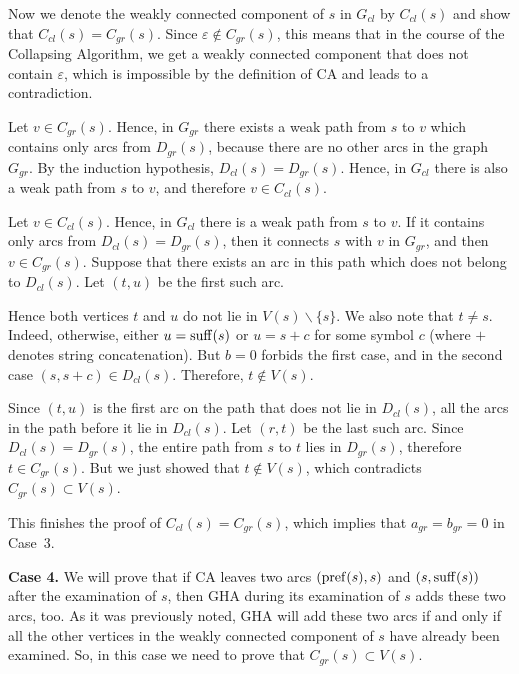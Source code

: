Now we denote the weakly connected component of $ s $ in $ G_{cl} $ by $ C_{cl} (s) $ and show that $ C_{cl} (s) = C_{gr} (s) $. Since $ \varepsilon \notin C_{gr} (s) $, this means that in the course of the Collapsing Algorithm, we get a weakly connected component that does not contain $ \varepsilon $, which is impossible by the definition of CA and leads to a contradiction.

Let $ v \in C_{gr} (s) $. Hence, in $ G_{gr} $ there exists a weak path from $ s $ to $ v $ which contains only arcs from $ D_{gr} (s) $, because there are no other arcs in the graph $G_{gr}$. By the induction hypothesis, $ D_{cl} (s) = D_{gr} (s) $. Hence, in $ G_{cl} $ there is also a weak path from $ s $ to $ v $, and therefore $ v \in C_{cl} (s) $.

Let $ v \in C_{cl} (s) $. Hence, in $ G_{cl} $ there is a weak path from $ s $ to $ v $. If it contains only arcs from $ D_{cl} (s) = D_{gr} (s) $, then it connects $ s $ with $ v $ in $ G_{gr} $, and then $ v \in C_{gr} (s) $. Suppose that there exists an arc in this path which does not belong to $ D_{cl} (s) $. Let $(t, u)$ be the first such arc.

Hence both vertices $ t $ and $ u $ do not lie in $ V (s) \backslash \{s \} $. We also note that $ t \ne s $. Indeed, otherwise, either $ u = \operatorname{suff} (s) $ or $ u = s + c $ for some symbol $ c $ (where $+$ denotes string concatenation). But $ b = 0 $ forbids the first case, and in the second case $ (s, s + c) \in D_{cl} (s) $. Therefore, $ t \notin V (s) $.

Since $ (t, u) $ is the first arc on the path that does not lie in $ D_{cl} (s) $, all the arcs in the path before it lie in $ D_{cl} (s) $. Let $ (r, t) $ be the last such arc. Since $ D_{cl} (s) = D_{gr} (s) $, the entire path from $ s $ to $ t $ lies in $ D_{gr} (s) $, therefore $ t \in C_{gr} (s) $. But we just showed that $ t \notin V (s) $, which contradicts $ C_{gr} (s) \subset V (s) $.

This finishes the proof of $ C_{cl} (s) = C_{gr} (s) $, which implies that $a_{gr}=b_{gr}=0$ in Case~3.

\textbf {Case 4.} We will prove that if CA leaves two arcs $ (\operatorname{pref} (s), s) $ and $ (s, \operatorname{suff} (s)) $ after the examination of $ s $, then GHA during its examination of $ s $ adds these two arcs, too. As it was previously noted, GHA will add these two arcs if and only if all the other vertices in the weakly connected component of $ s $ have already been examined. So, in this case we need to prove that $ C_{gr} (s) \subset V (s) $.

